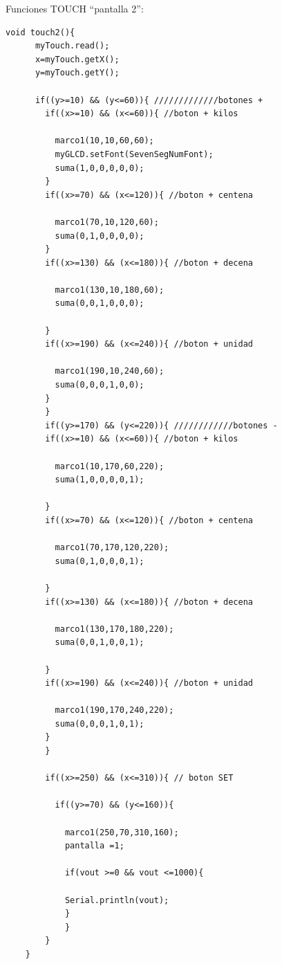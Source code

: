  Funciones TOUCH ``pantalla 2'':
\begin{verbatim}
void touch2(){
      myTouch.read();
      x=myTouch.getX();
      y=myTouch.getY();

      if((y>=10) && (y<=60)){ /////////////botones +
        if((x>=10) && (x<=60)){ //boton + kilos
        
          marco1(10,10,60,60);
          myGLCD.setFont(SevenSegNumFont); 
          suma(1,0,0,0,0,0);
        }
        if((x>=70) && (x<=120)){ //boton + centena
        
          marco1(70,10,120,60);
          suma(0,1,0,0,0,0);
        }
        if((x>=130) && (x<=180)){ //boton + decena
        
          marco1(130,10,180,60); 
          suma(0,0,1,0,0,0);
          
        }
        if((x>=190) && (x<=240)){ //boton + unidad
        
          marco1(190,10,240,60);
          suma(0,0,0,1,0,0);
        }
        }
        if((y>=170) && (y<=220)){ ////////////botones -
        if((x>=10) && (x<=60)){ //boton + kilos
        
          marco1(10,170,60,220);
          suma(1,0,0,0,0,1);
          
        }
        if((x>=70) && (x<=120)){ //boton + centena
        
          marco1(70,170,120,220);
          suma(0,1,0,0,0,1);
          
        }
        if((x>=130) && (x<=180)){ //boton + decena
        
          marco1(130,170,180,220);
          suma(0,0,1,0,0,1);
          
        }
        if((x>=190) && (x<=240)){ //boton + unidad
        
          marco1(190,170,240,220);
          suma(0,0,0,1,0,1);
        }
        }

        if((x>=250) && (x<=310)){ // boton SET

          if((y>=70) && (y<=160)){
          
            marco1(250,70,310,160);
            pantalla =1;
            
            if(vout >=0 && vout <=1000){
            
            Serial.println(vout);
            }
            }    
        }
    }
    
\end{verbatim}

